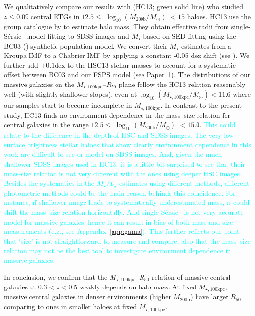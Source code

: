 \documentclass[a4paper,fleqn,usenatbib]{mnras}
\def\ser{{S\'{e}rsic\ }}
\def\mstar{{$M_{\star}$}}
\def\mhalo{{$M_{\mathrm{200b}}$}}
\def\logmh{{$\log_{10} (M_{\mathrm{200b}}/M_{\odot})$}}
\def\mtot{{$M_{\star,100\mathrm{kpc}}$}}
\def\logmtot{{$\log_{10} (M_{\star,100\mathrm{kpc}}/M_{\odot})$}}
\def\m2l{{$M_{\star}/L_{\star}$}}
\newcommand{\song}[1]{\textcolor{cyan}{#1}}
\begin{document}
    We qualitatively compare our results with \citealt{HCompany13} (HC13; 
    green solid line) who studied $z\leq 0.09$ central ETGs in 
    $12.5 \le$ \logmh{} $< 15$ haloes. 
    HC13 use the group catalogue by \citet{Yang2007} to estimate halo mass. 
    They obtain effective radii from single-\ser{} model fitting to SDSS 
    images and \mstar{} based on SED fitting using the BC03 (\citealt{BC03}) 
    synthetic population model. 
    We convert their \mstar{} estimates from a Kroupa IMF to a Chabrier 
    IMF by applying a constant -0.05 dex shift (see \citealt{Bernardi2016a}). 
    We further add $+0.1$dex to the HSC13 stellar masses to account for a systematic 
    offset between BC03 and our FSPS model (see Paper~1). 
    The distributions of our massive galaxies on the \mtot{}--$R_{\mathrm{50}}$ 
    plane follow the HC13 relation reasonably well (with slightly shallower slopes), 
    even at \logmtot{}$< 11.6$ where our samples start to become incomplete in \mtot{}. 
    In contrast to the present study, HC13 finds no environment dependence in the 
    mass--size relation for central galaxies in the range $12.5\le$ \logmh{} $<15.0$. 
    \song{
    This could relate to the difference in the depth of HSC and SDSS images.
    The very low surface brightness stellar haloes that show clearly 
    environment dependence in this work are difficult to see or model on SDSS images.        
    And, given the much shallower SDSS images used in HC13, it is a little bit 
    surprised to see that their mass-size relation is not very different with the
    ones using deeper HSC images. 
    Besides the systematics in the \m2l{} estimates using different methods, 
    different photometric methods could be the main reason behinds this 
    coincidence.
    For instance, if shallower image leads to systematically underestimated mass, 
    it could shift the mass--size relation horizontally.  
    And single-\ser{} is not very accurate model for massive galaxies, hence it 
    can result in bias of both mass and size measurements (e.g., see 
    Appendix~\ref{app:gama}). 
    This further reflects our point that `size' is not straightforward to measure 
    and compare, also that the mass--size relation may not be the best tool to 
    investigate environment dependence in massive galaxies. 
    }    

    In conclusion, we confirm that the \mtot{}--$R_{\mathrm{50}}$ relation of massive
    central galaxies at $0.3 < z < 0.5$ weakly depends on halo mass. 
    At fixed \mtot{}, massive central galaxies in denser environments (higher \mhalo{}) 
    have larger $R_{\mathrm{50}}$ comparing to ones in smaller haloes at fixed 
    \mtot{}. 
    
\end{document}
